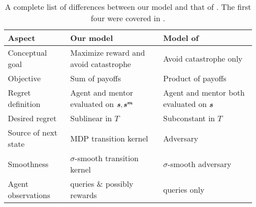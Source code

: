 \begin{table}[tb]
\centering
\caption{A complete list of differences between our model and that of \cite{plaut_avoiding_2024}. The first four were covered in .}
\begin{tabular}{p{} p{} p{}}
\toprule
\textbf{Aspect} & \textbf{Our model} & \textbf{Model of \cite{plaut_avoiding_2024}} \\
\midrule
Conceptual goal & Maximize reward and avoid catastrophe & Avoid catastrophe only \\
\midrule
Objective & Sum of payoffs & Product of payoffs \\
\midrule
Regret definition & Agent and mentor evaluated on $\boldsymbol{s},\boldsymbol{s^m}$ & Agent and mentor both evaluated on $\boldsymbol{s}$ \\
\midrule
Desired regret & Sublinear in $T$ & Subconstant in $T$ \\
\midrule
Source of next state & MDP transition kernel & Adversary \\
\midrule
Smoothness & $\sigma$-smooth transition kernel & $\sigma$-smooth adversary \\
\midrule
Agent observations & queries \& possibly rewards & queries only\\
\bottomrule
\end{tabular}
\label{tab:model-comparison-full}
\end{table}
